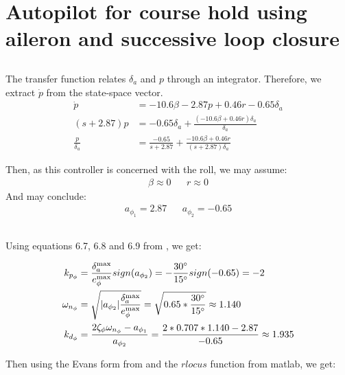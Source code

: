 \section{Autopilot for course hold using aileron and successive loop closure}
\subsection{}
The transfer function relates $\delta_a$ and $p$ through an integrator. Therefore, we extract $\dot{p}$ from the state-space vector. 
\begin{align*}
    \dot{p} &= -10.6 \beta - 2.87 p + 0.46 r - 0.65 \delta_a \\
    (s + 2.87) p &= - 0.65 \delta_a  + \frac{(-10.6 \beta + 0.46 r) \delta_a }{\delta_a} \\
    \frac{p}{\delta_a} &= \frac{-0.65}{s + 2.87} + \frac{-10.6 \beta + 0.46 r}{(s + 2.87)\delta_a}
\end{align*}

Then, as this controller is concerned with the roll, we may assume: %
\begin{align*}
    \beta \approx 0 && r \approx 0
\end{align*}
And may conclude: 
\begin{align*}
    a_{\phi_1} = 2.87 && a_{\phi_2} = -0.65
\end{align*}

\subsection{}
Using equations 6.7, 6.8 and 6.9 from \cite[page 100]{beard_mclain_2012}, we get: 

\begin{align*}
    k_{p_\phi} &= \frac{\delta_{a}^{\max}}{e_{\phi}^{\max}} sign(a_{\phi_2}) 
    = - \frac{30 \degree}{15 \degree} sign(-0.65)
    = -2 \\
    \omega_{n_{\phi}} &= \sqrt{|a_{\phi_2}| \frac{\delta_a^{\max}}{e_{\phi}^{\max}}} 
    = \sqrt{0.65 * \frac{30 \degree}{15 \degree}} 
    \approx 1.140 \\
    k_{d_\phi} &= \frac{2 \zeta_{\phi} \omega_{n_\phi} - a_{\phi_1}}{a_{\phi_2}} 
    = \frac{2 * 0.707 * 1.140 - 2.87}{-0.65}
    \approx 1.935
\end{align*}

Then using the Evans form from \cite[page 102]{beard_mclain_2012} and the $rlocus$ function from matlab, we get: 

